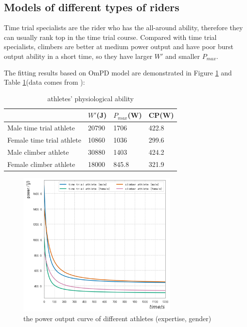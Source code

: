 \documentclass{mcmthesis}
\begin{document}
\subsection{Models of different types of riders}
Time trial specialists are the rider who has the all-around ability, therefore they can usually rank top in the time trial course. Compared with time trial specialists, climbers are better at medium power output and have poor burst output ability in a short time, so they have larger ${W}'$ and smaller $P_{max}$.
\par
The fitting results based on OmPD model are demonstrated in Figure \ref{fig:power output curve} and Table \ref{tab:different peple}(data comes from \cite{johnstone_how_nodate}):
\begin{table}[H]
\centering
\caption{athletes' physiological ability} 
\begin{tabular}{llll}
\hline
                          & ${W}'$(J) & $P_{max}$(W) & CP(W) \\ \hline
Male time trial athlete   & 20790 & 1706    & 422.8 \\
Female time trial athlete & 10860 & 1036    & 299.6 \\
Male climber athlete      & 30880 & 1403    & 424.2   \\
Female climber athlete    & 18000 & 845.8   & 321.9   \\ \hline
\end{tabular}
\label{tab:different peple}
\end{table}
\begin{figure}[H]
\small
\centering
\includegraphics[width=8cm]{mcmthesis/figures/athlete-power-curve.png}
\caption{the power output curve of different athletes (expertise, gender)} 
\label{fig:power output curve}
\end{figure}
\end{document}
